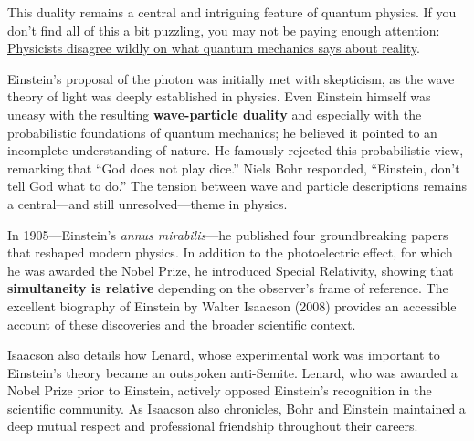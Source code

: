 \documentclass[
  letterpaper,
]{book}
\begin{document}
This duality remains a central and intriguing feature of quantum
physics. If you don't find all of this a bit puzzling, you may not be
paying enough attention:
\href{https://www.nature.com/articles/d41586-025-02342-y?utm_source=Live+Audience&utm_campaign=a8d315930b-nature-briefing-daily-20250730&utm_medium=email&utm_term=0_-33f35e09ea-49658492}{Physicists
disagree wildly on what quantum mechanics says about reality}.

\begin{tcolorbox}[enhanced jigsaw, opacityback=0, breakable, coltitle=black, leftrule=.75mm, left=2mm, colframe=quarto-callout-note-color-frame, opacitybacktitle=0.6, bottomtitle=1mm, bottomrule=.15mm, toprule=.15mm, title=\textcolor{quarto-callout-note-color}{\faInfo}\hspace{0.5em}{Einstein, Bohr, and Lenard}, titlerule=0mm, toptitle=1mm, colback=white, rightrule=.15mm, colbacktitle=quarto-callout-note-color!10!white, arc=.35mm]

Einstein's proposal of the photon was initially met with skepticism, as
the wave theory of light was deeply established in physics. Even
Einstein himself was uneasy with the resulting \textbf{wave-particle
duality} and especially with the probabilistic foundations of quantum
mechanics; he believed it pointed to an incomplete understanding of
nature. He famously rejected this probabilistic view, remarking that
``God does not play dice.'' Niels Bohr responded, ``Einstein, don't tell
God what to do.'' The tension between wave and particle descriptions
remains a central---and still unresolved---theme in physics.

In 1905---Einstein's \emph{annus mirabilis}---he published four
groundbreaking papers that reshaped modern physics. In addition to the
photoelectric effect, for which he was awarded the Nobel Prize, he
introduced Special Relativity, showing that \textbf{simultaneity is
relative} depending on the observer's frame of reference. The excellent
biography of Einstein by Walter Isaacson (2008) provides an accessible
account of these discoveries and the broader scientific context.

Isaacson also details how Lenard, whose experimental work was important
to Einstein's theory became an outspoken anti-Semite. Lenard, who was
awarded a Nobel Prize prior to Einstein, actively opposed Einstein's
recognition in the scientific community. As Isaacson also chronicles,
Bohr and Einstein maintained a deep mutual respect and professional
friendship throughout their careers.

\end{tcolorbox}
\end{document}
